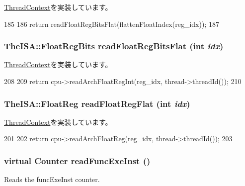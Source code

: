 \hyperlink{classThreadContext_a66bf9e1bf11ad15d1903209dd37014c5}{ThreadContext}を実装しています。


\begin{DoxyCode}
185                                                        {
186         return readFloatRegBitsFlat(flattenFloatIndex(reg_idx));
187     }
\end{DoxyCode}
\hypertarget{classO3ThreadContext_a86d029a01b9faaab8b1480cd407528e6}{
\subsubsection[{readFloatRegBitsFlat}]{\setlength{\rightskip}{0pt plus 5cm}TheISA::FloatRegBits readFloatRegBitsFlat (int {\em idx})}}
\label{classO3ThreadContext_a86d029a01b9faaab8b1480cd407528e6}


\hyperlink{classThreadContext_a3715f0deff5e4aeb64a8cf3ca293068b}{ThreadContext}を実装しています。


\begin{DoxyCode}
208 {
209     return cpu->readArchFloatRegInt(reg_idx, thread->threadId());
210 }
\end{DoxyCode}
\hypertarget{classO3ThreadContext_abdeceb5c5aac44f73966cdb8a588d5d5}{
\subsubsection[{readFloatRegFlat}]{\setlength{\rightskip}{0pt plus 5cm}TheISA::FloatReg readFloatRegFlat (int {\em idx})}}
\label{classO3ThreadContext_abdeceb5c5aac44f73966cdb8a588d5d5}


\hyperlink{classThreadContext_a275e2481d9069a0ae8142fb7cc901cbf}{ThreadContext}を実装しています。


\begin{DoxyCode}
201 {
202     return cpu->readArchFloatReg(reg_idx, thread->threadId());
203 }
\end{DoxyCode}
\hypertarget{classO3ThreadContext_a73cff115f1db487a2b2e2cb162035cf5}{
\subsubsection[{readFuncExeInst}]{\setlength{\rightskip}{0pt plus 5cm}virtual {\bf Counter} readFuncExeInst ()}}
\label{classO3ThreadContext_a73cff115f1db487a2b2e2cb162035cf5}
Reads the funcExeInst counter. 

